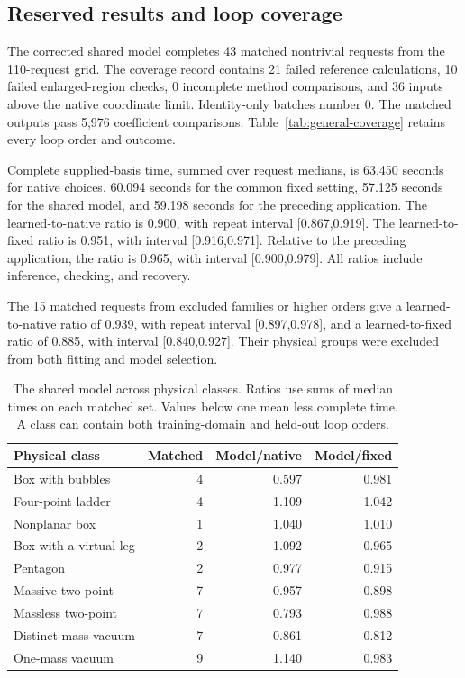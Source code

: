 \subsection{Reserved results and loop coverage}
\label{sec:general-results}
The corrected shared model completes 43 matched nontrivial requests from the 110-request grid. The coverage record contains 21 failed reference calculations, 10 failed enlarged-region checks, 0 incomplete method comparisons, and 36 inputs above the native coordinate limit. Identity-only batches number 0. The matched outputs pass 5,976 coefficient comparisons. Table~\ref{tab:general-coverage} retains every loop order and outcome.

Complete supplied-basis time, summed over request medians, is 63.450 seconds for native choices, 60.094 seconds for the common fixed setting, 57.125 seconds for the shared model, and 59.198 seconds for the preceding application. The learned-to-native ratio is 0.900, with repeat interval [0.867,0.919]. The learned-to-fixed ratio is 0.951, with interval [0.916,0.971]. Relative to the preceding application, the ratio is 0.965, with interval [0.900,0.979]. All ratios include inference, checking, and recovery.

The 15 matched requests from excluded families or higher orders give a learned-to-native ratio of 0.939, with repeat interval [0.897,0.978], and a learned-to-fixed ratio of 0.885, with interval [0.840,0.927]. Their physical groups were excluded from both fitting and model selection.

\begin{table}[!htbp]\centering\small
\caption{The shared model across physical classes. Ratios use sums of median times on each matched set. Values below one mean less complete time. A class can contain both training-domain and held-out loop orders.}
\label{tab:general-classes}
\begin{tabularx}{\linewidth}{@{}Yrrr@{}}\toprule
Physical class & Matched & Model/native & Model/fixed\\\midrule
Box with bubbles & 4 & 0.597 & 0.981\\
Four-point ladder & 4 & 1.109 & 1.042\\
Nonplanar box & 1 & 1.040 & 1.010\\
Box with a virtual leg & 2 & 1.092 & 0.965\\
Pentagon & 2 & 0.977 & 0.915\\
Massive two-point & 7 & 0.957 & 0.898\\
Massless two-point & 7 & 0.793 & 0.988\\
Distinct-mass vacuum & 7 & 0.861 & 0.812\\
One-mass vacuum & 9 & 1.140 & 0.983\\
\bottomrule\end{tabularx}\end{table}

